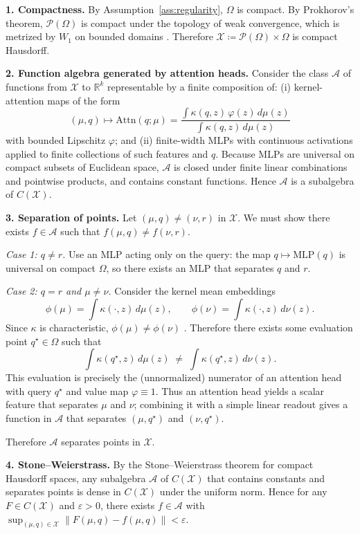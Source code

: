 \documentclass{article}
\theoremstyle{plain}
\theoremstyle{definition}
\theoremstyle{remark}
\newcommand{\OmegaSpace}{\Omega} %
\newcommand{\Pspace}{\mathcal{P}(\OmegaSpace)} %
\newcommand{\Wass}[1]{W_{#1}} %
\newcommand{\Attn}{\text{Attn}}
\begin{document}
\textbf{1. Compactness.}
By Assumption~\ref{ass:regularity}, $\OmegaSpace$ is compact. By Prokhorov's theorem,
$\Pspace$ is compact under the topology of weak convergence, which is metrized by
$\Wass{1}$ on bounded domains \citep{villani2009optimal}. Therefore
$\mathcal{X} \coloneqq \Pspace \times \OmegaSpace$ is compact Hausdorff.

\textbf{2. Function algebra generated by attention heads.}
Consider the class $\mathcal{A}$ of functions from $\mathcal{X}$ to $\mathbb{R}^k$
representable by a finite composition of:
(i) kernel-attention maps of the form
\[
    (\mu,q) \mapsto 
    \Attn(q;\mu) 
    =
    \frac{\int \kappa(q,z)\,\varphi(z)\, d\mu(z)}
         {\int \kappa(q,z)\, d\mu(z)}
\]
with bounded Lipschitz $\varphi$; and
(ii) finite-width MLPs with continuous activations applied to finite collections of such
features and $q$. Because MLPs are universal on compact subsets of Euclidean space,
$\mathcal{A}$ is closed under finite linear combinations and pointwise products, and
contains constant functions. Hence $\mathcal{A}$ is a subalgebra of $C(\mathcal{X})$.

\textbf{3. Separation of points.}
Let $(\mu,q)\neq(\nu,r)$ in $\mathcal{X}$. We must show there exists $f\in\mathcal{A}$
such that $f(\mu,q)\neq f(\nu,r)$.

\emph{Case 1: $q\neq r$.}  
Use an MLP acting only on the query: the map
$q \mapsto \mathrm{MLP}(q)$ is universal on compact $\OmegaSpace$, so there exists an MLP
that separates $q$ and $r$.

\emph{Case 2: $q=r$ and $\mu\neq\nu$.}  
Consider the kernel mean embeddings
\[
    \phi(\mu) = \int \kappa(\cdot,z)\,d\mu(z),
    \qquad
    \phi(\nu) = \int \kappa(\cdot,z)\,d\nu(z).
\]
Since $\kappa$ is characteristic, $\phi(\mu)\neq\phi(\nu)$
\citep{muandet2017kernel,sriperumbudur2010hilbert}. Therefore there exists some
evaluation point $q^\star\in\OmegaSpace$ such that
\[
    \int \kappa(q^\star,z)\, d\mu(z)
    \;\neq\;
    \int \kappa(q^\star,z)\, d\nu(z).
\]
This evaluation is precisely the (unnormalized) numerator of an attention head with
query $q^\star$ and value map $\varphi\equiv 1$. Thus an attention head yields a scalar
feature that separates $\mu$ and $\nu$; combining it with a simple linear readout gives a
function in $\mathcal{A}$ that separates $(\mu,q^\star)$ and $(\nu,q^\star)$.

Therefore $\mathcal{A}$ separates points in $\mathcal{X}$.

\textbf{4. Stone--Weierstrass.}
By the Stone--Weierstrass theorem for compact Hausdorff spaces, any subalgebra
$\mathcal{A}$ of $C(\mathcal{X})$ that contains constants and separates points is dense
in $C(\mathcal{X})$ under the uniform norm. Hence for any $F\in C(\mathcal{X})$ and
$\varepsilon>0$, there exists $f\in\mathcal{A}$ with
$\sup_{(\mu,q)\in\mathcal{X}}\|F(\mu,q)-f(\mu,q)\| < \varepsilon$.
\end{document}
